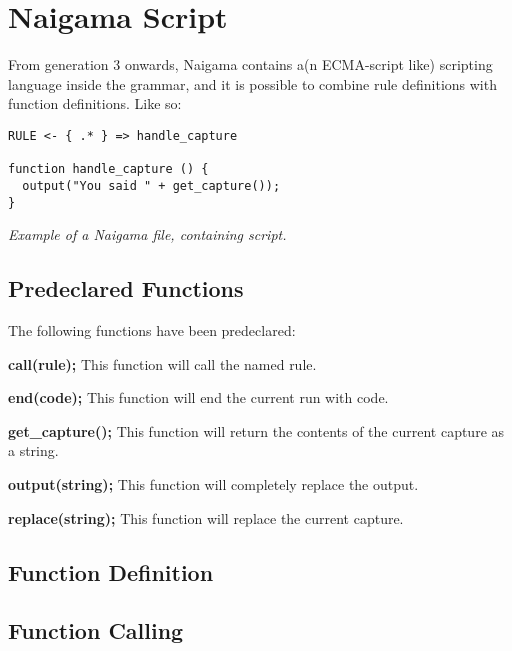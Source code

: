 \section{Naigama Script}

From generation 3 onwards, Naigama contains a(n ECMA-script like)
scripting language inside the grammar, and it is possible to combine
rule definitions with function definitions. Like so:

\begin{myquote}
\begin{verbatim}
RULE <- { .* } => handle_capture

function handle_capture () {
  output("You said " + get_capture());
}

\end{verbatim}
\end{myquote}
\textit{Example of a Naigama file, containing script.}

\subsection{Predeclared Functions}

The following functions have been predeclared:

\newline
\textbf{call(rule);}
\newline
This function will call the named rule.

\newline
\textbf{end(code);}
\newline
This function will end the current run with code.

\newline
\textbf{get\_capture();}
\newline
This function will return the contents of the current capture
as a string.

\newline
\textbf{output(string);}
\newline
This function will completely replace the output.

\newline
\textbf{replace(string);}
\newline
This function will replace the current capture.

\subsection{Function Definition}

\subsection{Function Calling}

